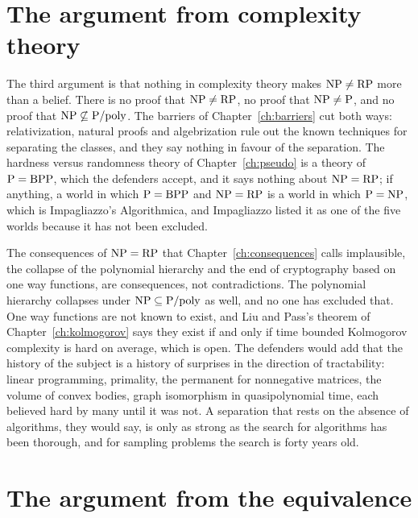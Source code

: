 \section{The argument from complexity theory}

The third argument is that nothing in complexity theory makes $\mathrm{NP} \ne \mathrm{RP}$ more than a belief. There is no proof that $\mathrm{NP} \ne \mathrm{RP}$, no proof that $\mathrm{NP} \ne \mathrm{P}$, and no proof that $\mathrm{NP} \not\subseteq \mathrm{P}/\mathrm{poly}$. The barriers of Chapter~\ref{ch:barriers} cut both ways: relativization, natural proofs and algebrization rule out the known techniques for separating the classes, and they say nothing in favour of the separation. The hardness versus randomness theory of Chapter~\ref{ch:pseudo} is a theory of $\mathrm{P} = \mathrm{BPP}$, which the defenders accept, and it says nothing about $\mathrm{NP} = \mathrm{RP}$; if anything, a world in which $\mathrm{P} = \mathrm{BPP}$ and $\mathrm{NP} = \mathrm{RP}$ is a world in which $\mathrm{P} = \mathrm{NP}$, which is Impagliazzo's Algorithmica, and Impagliazzo listed it as one of the five worlds because it has not been excluded.

The consequences of $\mathrm{NP} = \mathrm{RP}$ that Chapter~\ref{ch:consequences} calls implausible, the collapse of the polynomial hierarchy and the end of cryptography based on one way functions, are consequences, not contradictions. The polynomial hierarchy collapses under $\mathrm{NP} \subseteq \mathrm{P}/\mathrm{poly}$ as well, and no one has excluded that. One way functions are not known to exist, and Liu and Pass's theorem of Chapter~\ref{ch:kolmogorov} says they exist if and only if time bounded Kolmogorov complexity is hard on average, which is open. The defenders would add that the history of the subject is a history of surprises in the direction of tractability: linear programming, primality, the permanent for nonnegative matrices, the volume of convex bodies, graph isomorphism in quasipolynomial time, each believed hard by many until it was not. A separation that rests on the absence of algorithms, they would say, is only as strong as the search for algorithms has been thorough, and for sampling problems the search is forty years old.

\section{The argument from the equivalence}

